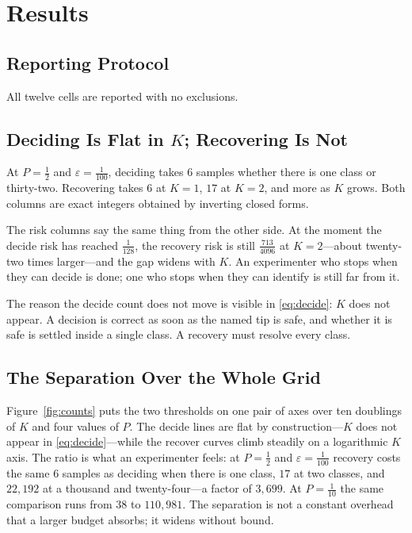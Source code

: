 \section{Results}
\label{sec:results}

\subsection{Reporting Protocol}

All twelve cells are reported with no exclusions.

\subsection{Deciding Is Flat in $K$; Recovering Is Not}

At $P=\tfrac12$ and $\varepsilon=\tfrac{1}{100}$, deciding takes $6$ samples whether there is
one class or thirty-two. Recovering takes $6$ at $K=1$, $17$ at $K=2$, and more as $K$ grows.
Both columns are exact integers obtained by inverting closed forms.

The risk columns say the same thing from the other side. At the moment the decide risk has
reached $\tfrac{1}{128}$, the recovery risk is still $\tfrac{713}{4096}$ at $K=2$---about
twenty-two times larger---and the gap widens with $K$. An experimenter who stops when they can
decide is done; one who stops when they can identify is still far from it.



The reason the decide count does not move is visible in \eqref{eq:decide}: $K$ does not appear.
A decision is correct as soon as the named tip is safe, and whether it is safe is settled
inside a single class. A recovery must resolve every class.

\subsection{The Separation Over the Whole Grid}

Figure~\ref{fig:counts} puts the two thresholds on one pair of axes over ten doublings of
$K$ and four values of $P$. The decide lines are flat by construction---$K$ does not appear in
\eqref{eq:decide}---while the recover curves climb steadily on a logarithmic $K$ axis. The
ratio is what an experimenter feels: at $P=\tfrac12$ and $\varepsilon=\tfrac1{100}$ recovery
costs the same $6$ samples as deciding when there is one class, $17$ at two classes, and
$22{,}192$ at a thousand and twenty-four---a factor of $3{,}699$. At $P=\tfrac1{10}$ the same
comparison runs from $38$ to $110{,}981$. The separation is not a constant overhead that a
larger budget absorbs; it widens without bound. \NUM{}

